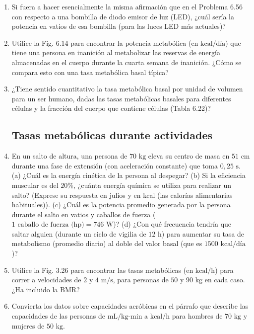 \documentclass[12pt]{book}
\begin{document}
\begin{enumerate}
\item[6.57] Si fuera a hacer esencialmente la misma afirmación que en el Problema 6.56 con respecto a una bombilla de diodo emisor de luz (LED), ¿cuál sería la potencia en vatios de esa bombilla (para las luces LED más actuales)?

\item[6.58] Utilice la Fig. 6.14 para encontrar la potencia metabólica (en $\text{kcal/día}$) que tiene una persona en inanición al metabolizar las reservas de energía almacenadas en el cuerpo durante la cuarta semana de inanición. ¿Cómo se compara esto con una tasa metabólica basal típica?

\item[6.59] ¿Tiene sentido cuantitativo la tasa metabólica basal por unidad de volumen para un ser humano, dadas las tasas metabólicas basales para diferentes células y la fracción del cuerpo que contiene células (Tabla 6.22)?

\subsection*{Tasas metabólicas durante actividades}

\item[6.60] En un salto de altura, una persona de $70\text{ kg}$ eleva su centro de masa en $51\text{ cm}$ durante una fase de extensión (con aceleración constante) que toma $0{,}25\text{ s}$. (a) ¿Cuál es la energía cinética de la persona al despegar? (b) Si la eficiencia muscular es del $20\%$, ¿cuánta energía química se utiliza para realizar un salto? (Exprese su respuesta en julios y en kcal (las calorías alimentarias habituales)). (c) ¿Cuál es la potencia promedio generada por la persona durante el salto en vatios y caballos de fuerza ($1\text{ caballo de fuerza (hp)} = 746\text{ W}$)? (d) ¿Con qué frecuencia tendría que saltar alguien (durante un ciclo de vigilia de $12\text{ h}$) para aumentar su tasa de metabolismo (promedio diario) al doble del valor basal (que es $1500\text{ kcal/día}$)?

\item[6.61] Utilice la Fig. 3.26 para encontrar las tasas metabólicas (en $\text{kcal/h}$) para correr a velocidades de $2$ y $4\text{ m/s}$, para personas de $50$ y $90\text{ kg}$ en cada caso. ¿Ha incluido la BMR?

\item[6.62] Convierta los datos sobre capacidades aeróbicas en el párrafo que describe las capacidades de las personas de $\text{mL/kg-min}$ a $\text{kcal/h}$ para hombres de $70\text{ kg}$ y mujeres de $50\text{ kg}$.


\end{enumerate}
\end{document}
